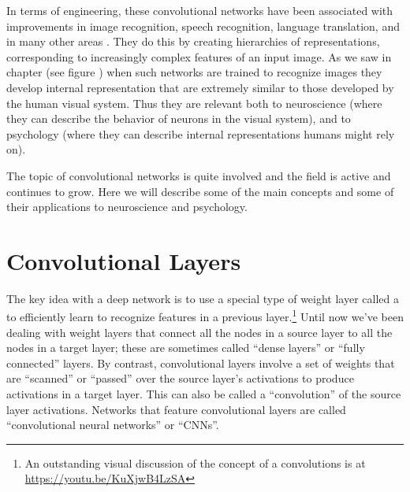 In terms of engineering, these convolutional networks have been associated with improvements in image recognition, speech recognition, language translation, and in many other areas \cite{lecun2015deep, goodfellow2016deep}. They do this by creating hierarchies of representations, corresponding  to increasingly complex features of an input image. As we saw in chapter  (see figure ) when such networks are trained to recognize images they develop internal representation that are extremely similar to those developed by the human visual  system. Thus they are relevant both to neuroscience (where they can describe the behavior of neurons in the visual system), and to psychology (where they can describe internal representations humans might rely on).

The topic of convolutional networks is quite involved and the field is active and continues to grow. Here we will describe some of the main concepts and some of their applications to neuroscience and psychology.

\section{Convolutional Layers}\label{convolutionalLayer}


The key idea with a deep network is to use a special type of weight layer called a  to efficiently learn to recognize features in a previous layer.\footnote{An outstanding visual discussion of the concept of a convolutions is at \url{https://youtu.be/KuXjwB4LzSA}} Until now we've been dealing with weight layers that connect all the nodes in a source layer to all the nodes in a target layer; these are sometimes called ``dense layers'' or ``fully connected'' layers. By contrast, convolutional layers involve a set of weights that are ``scanned'' or ``passed'' over the source layer's activations to produce activations in a target layer. This can also be called a ``convolution'' of the source layer activations. Networks that feature convolutional layers are called ``convolutional neural networks'' or ``CNNs''.

